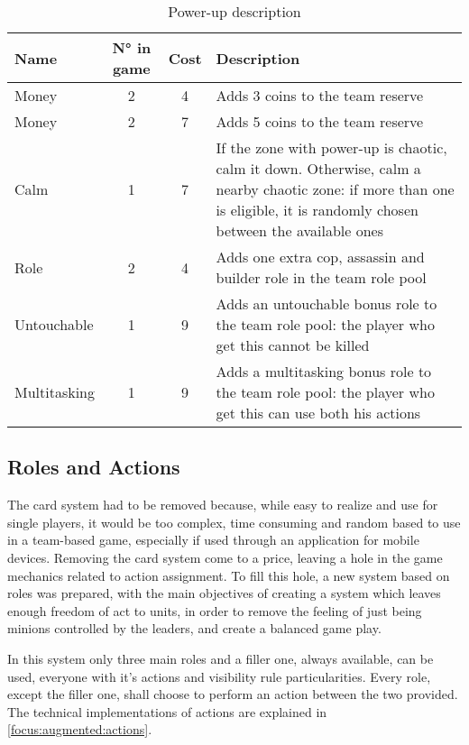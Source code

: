 			\begin{table}
				\caption{Power-up description}
				\label{powup:desc}
				\centering
				\begin{tabular}{lccp{}}
					\toprule
					Name 			& N° in game& Cost 	& Description \\
					\midrule
					Money 			& 2 		& 4 	& Adds 3 coins to the team reserve \\
					Money 			& 2 		& 7 	& Adds 5 coins to the team reserve \\
					Calm 			& 1 		& 7 	& If the zone with power-up is chaotic, calm it down. Otherwise, calm a nearby chaotic zone: if more than one is eligible, it is randomly chosen between the available ones \\
					Role 			& 2 		& 4 	& Adds one extra cop, assassin and builder role in the team role pool \\
					Untouchable 	& 1 		& 9 	& Adds an untouchable bonus role to the team role pool: the player who get this cannot be killed \\
					Multitasking 	& 1 		& 9 	& Adds a multitasking bonus role to the team role pool: the player who get this can use both his actions \\
					\bottomrule
				\end{tabular}
			\end{table}
		
		\subsection{Roles and Actions}
		
			The card system had to be removed because, while easy to realize and use for single players, it would be too complex, time consuming and random based to use in a team-based game, especially if used through an application for mobile devices.
			Removing the card system come to a price, leaving a hole in the game mechanics related to action assignment. To fill this hole, a new system based on roles was prepared, with the main objectives of creating a system which leaves enough freedom of act to units, in order to remove the feeling of just being minions controlled by the leaders, and create a balanced game play.
			
			In this system only three main roles and a filler one, always available, can be used, everyone with it's actions and visibility rule particularities.
			Every role, except the filler one, shall choose to perform an action between the two provided.
			The technical implementations of actions are explained in \autoref{focus:augmented:actions}.
		
